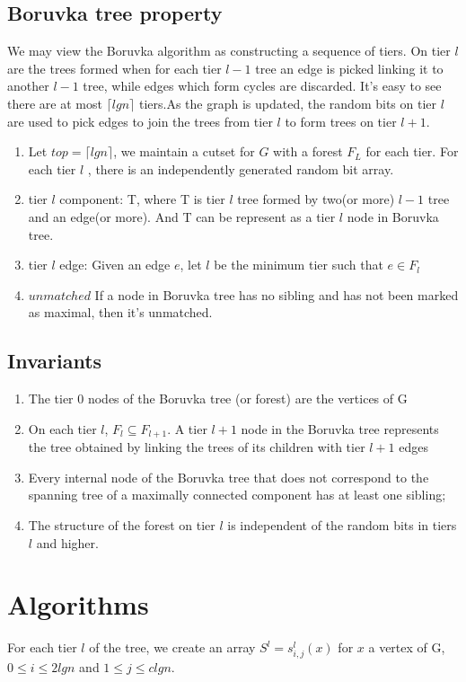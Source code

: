 \documentclass[conference,compsoc]{IEEEtran}
\begin{document}
\subsection{Boruvka tree property}
	We may view the Boruvka algorithm as constructing a sequence of tiers. On tier $l$ are the trees formed when for each tier $l−1$ tree an edge is picked linking it to another $l−1$ tree, while edges which form cycles are discarded. It's easy to see there are at most
	$\lceil lg n\rceil$ tiers.As the graph is updated, the random bits on tier $l$ are used to pick edges to join the trees from tier $l$ to form trees on tier $l + 1$.
	\begin{enumerate}
\item Let $top = \lceil lg n\rceil$, we maintain a cutset for $G$ with a forest $F_L$ for each tier. For each
tier $l$ , there is an independently generated random bit
array.
\item tier $l$ component: T, where T is tier $l$ tree formed by two(or more) $l-1$ tree and an edge(or more). And T can be represent as a tier $l$ node in Boruvka tree.
\item tier $l$ edge: Given an edge $e$, let $l$ be the minimum tier
such that $e \in F_l$
\item $unmatched$ If a node in Boruvka tree has no sibling and has not been marked as maximal, then it's unmatched.
\end{enumerate}

\subsection{Invariants}
\begin{enumerate}
	\item The tier 0 nodes of the Boruvka tree (or forest) are the vertices of G
	\item On each tier $l$, $F_l \subseteq F_{l+1}$. A tier $l + 1$ node in the Boruvka tree represents the tree obtained by linking the trees of its children with tier $l + 1$ edges
	\item Every internal node of the Boruvka tree that does not correspond to the spanning tree of a maximally connected component has at least one sibling;
	\item The structure of the forest on tier $l$ is independent of the random bits in tiers $l$ and higher.
\end{enumerate}

\section{Algorithms}
For each tier $l$ of the tree, we create
an array $S^l = s_{i,j}^l(x)$ for $x$ a vertex of G, $0 \leq
i \leq 2 lg n$ and $1 \leq j \leq c lg n$.
\end{document}
